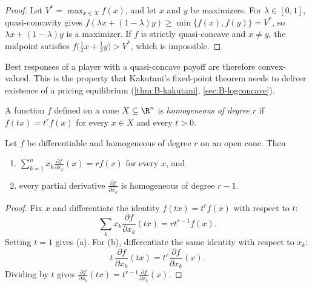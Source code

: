 \begin{proof}
Let $V^* = \max_{x \in X}f(x)$, and let $x$ and $y$ be maximizers. For $\lambda \in [0, 1]$, quasi-concavity gives
$f(\lambda x + (1 - \lambda)y) \geq \min\{f(x), f(y)\} = V^*$, so $\lambda x + (1 - \lambda)y$ is a maximizer. If $f$ is
strictly quasi-concave and $x \neq y$, the midpoint satisfies $f\big(\frac{1}{2}x + \frac{1}{2}y\big) > V^*$, which is
impossible.
\end{proof}

Best responses of a player with a quasi-concave payoff are therefore convex-valued. This is the property that
Kakutani's fixed-point theorem needs to deliver existence of a pricing equilibrium (\cref{thm:B-kakutani},
\cref{sec:B-logconcave}).

\begin{definition}[Homogeneity]\label{def:B-homogeneous}
A function $f$ defined on a cone $X \subseteq \R^n$ is \emph{homogeneous of degree $r$} if $f(tx) = t^rf(x)$ for
every $x \in X$ and every $t > 0$.
\end{definition}

\begin{proposition}\label{prop:B-euler}
Let $f$ be differentiable and homogeneous of degree $r$ on an open cone. Then
\begin{enumerate}[label=(\alph*)]
  \item $\sum_{k = 1}^{n}x_k\frac{\partial f}{\partial x_k}(x) = r f(x)$ for every $x$, and
  \item every partial derivative $\frac{\partial f}{\partial x_k}$ is homogeneous of degree $r - 1$.
\end{enumerate}
\end{proposition}

\begin{proof}
Fix $x$ and differentiate the identity $f(tx) = t^rf(x)$ with respect to $t$:
\begin{equation*}
\sum_{k}x_k\frac{\partial f}{\partial x_k}(tx) = r t^{r - 1}f(x) .
\end{equation*}
Setting $t = 1$ gives (a). For (b), differentiate the same identity with respect to $x_k$:
\begin{equation*}
t\,\frac{\partial f}{\partial x_k}(tx) = t^r\frac{\partial f}{\partial x_k}(x) .
\end{equation*}
Dividing by $t$ gives $\frac{\partial f}{\partial x_k}(tx) = t^{r - 1}\frac{\partial f}{\partial x_k}(x)$.
\end{proof}

